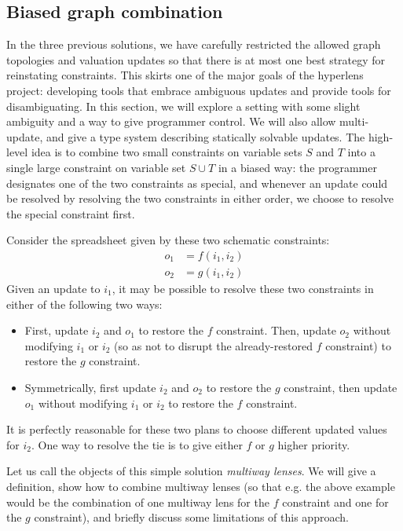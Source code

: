 \subsection{Biased graph combination}
\label{sec:nonassociative_composition}
In the three previous solutions, we have carefully restricted the allowed
graph topologies and valuation updates so that there is at most one best
strategy for reinstating constraints. This skirts one of the major goals of
the hyperlens project: developing tools that embrace ambiguous updates and
provide tools for disambiguating. In this section, we will explore a setting
with some slight ambiguity and a way to give programmer control. We will
also allow multi-update, and give a type system describing statically
solvable updates. The high-level idea is to combine two small constraints on
variable sets $S$ and $T$ into a single large constraint on variable set $S
\cup T$ in a biased way: the programmer designates one of the two
constraints as special, and whenever an update could be resolved by
resolving the two constraints in either order, we choose to resolve the
special constraint first.

Consider the spreadsheet given by these two schematic constraints:
\begin{align*}
    o_1 &= f(i_1, i_2) \\
    o_2 &= g(i_1, i_2)
\end{align*}
Given an update to $i_1$, it may be possible to resolve these two
constraints in either of the following two ways:
\begin{itemize}
    \item First, update $i_2$ and $o_1$ to restore the $f$ constraint.
        Then, update $o_2$ without modifying $i_1$ or $i_2$ (so as not to
        disrupt the already-restored $f$ constraint) to restore the $g$
        constraint.
    \item Symmetrically, first update $i_2$ and $o_2$ to restore the $g$
        constraint, then update $o_1$ without modifying $i_1$ or $i_2$ to
        restore the $f$ constraint.
\end{itemize}
It is perfectly reasonable for these two plans to choose different updated
values for $i_2$. One way to resolve the tie is to give either $f$ or $g$
higher priority.

Let us call the objects of this simple solution \emph{multiway lenses}. We
will give a definition, show how to combine multiway lenses (so that e.g.
the above example would be the combination of one multiway lens for the $f$
constraint and one for the $g$ constraint), and briefly discuss some
limitations of this approach.


